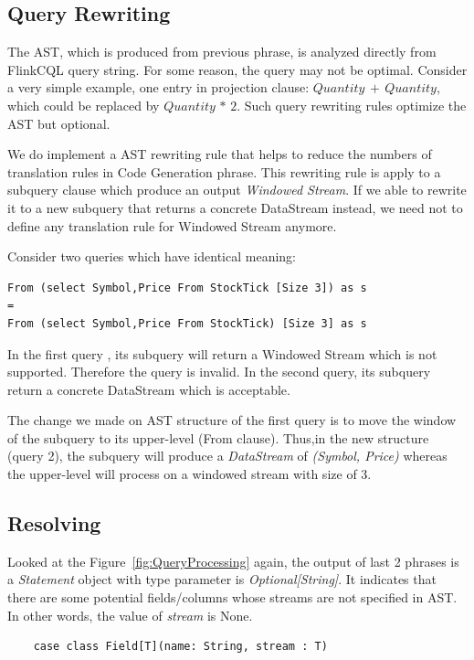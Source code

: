 \subsection{Query Rewriting}
The AST, which is produced from previous phrase, is analyzed directly from FlinkCQL query string. For some reason, the query may not be optimal. Consider a very simple example, one entry in projection clause: $Quantity\, +\, Quantity$, which could be replaced by $Quantity\, *\, 2$. Such query rewriting rules optimize the AST but optional. 

We  do implement a AST rewriting rule that helps to reduce the numbers of translation rules in Code Generation phrase. This rewriting rule is apply to a subquery clause which produce an output \textit{Windowed Stream}. If we able to rewrite it to a new subquery that returns a concrete DataStream instead, we need not to define any translation rule for Windowed Stream anymore.

Consider two queries which have identical meaning:

\begin{lstlisting}
From (select Symbol,Price From StockTick [Size 3]) as s
=
From (select Symbol,Price From StockTick) [Size 3] as s
\end{lstlisting}

In the first query , its subquery will return a Windowed Stream which is not supported. Therefore the query is invalid. In the second query, its subquery return a concrete DataStream which is acceptable.

The change we made on AST structure of the first query is to move the window of the subquery to its upper-level (From clause). Thus,in the new structure (query 2), the subquery will produce a \textit{DataStream} of \textit{(Symbol, Price)} whereas the upper-level will process on a windowed stream with size of 3. 

\subsection{Resolving}
Looked at the Figure~\ref{fig:QueryProcessing} again,  the output of last 2 phrases is a \textit{Statement} object with type parameter is \textit{Optional[String]}.
It indicates that there are some potential fields/columns whose streams are not specified in AST. In other words, the value of \textit{stream} is None.
\begin{lstlisting}
	case class Field[T](name: String, stream : T)
\end{lstlisting}

